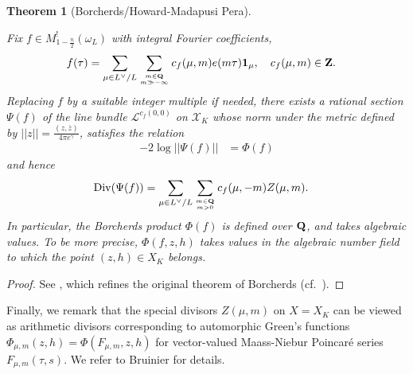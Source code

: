 \documentclass{amsart}
\newtheorem{theorem}{Theorem}[section]
\theoremstyle{definition}
\theoremstyle{definition}
\theoremstyle{definition}
\begin{document}
\begin{theorem}[Borcherds/Howard-Madapusi Pera]\label{HM-P}

Fix $f \in M_{1-\frac{n}{2}}^!(\omega_L)$ with integral Fourier coefficients,
\begin{align*} f(\tau) &= \sum\limits_{\mu \in L^{\vee}/L} 
\sum\limits_{m \in {\bf{Q}} \atop m \gg - \infty} c_f(\mu, m) e(m \tau) {\bf{1}}_{\mu}, \quad c_f(\mu, m) \in {\bf{Z}}.\end{align*}
Replacing $f$ by a suitable integer multiple if needed, there exists a rational section $\Psi(f)$ of the line bundle 
$\mathcal{L}^{c_f(0,0)}$ on $\mathcal{X}_K$ whose norm under the metric defined by $\vert \vert z \vert \vert = \frac{(z, \overline{z})}{4 \pi e^{\gamma}}$,
satisfies the relation 
\begin{align*} - 2 \log \vert \vert \Psi(f) \vert \vert &= \Phi(f) \end{align*}
and hence 
\begin{align*} \operatorname{Div}(\Psi(f)) &= \sum\limits_{\mu \in L^{\vee}/L} \sum\limits_{m \in {\bf{Q}} \atop m>0 } c_f(\mu, -m) Z(\mu, m). \end{align*}
In particular, the Borcherds product $\Phi(f)$ is defined over ${\bf{Q}}$, and takes algebraic values.
To be more precise, $\Phi(f, z, h)$ takes values in the algebraic number field to which the point $(z, h) \in X_K$ belongs. \end{theorem}

\begin{proof} See \cite[Theorem 9.1.1]{HMP}, which refines the original theorem of Borcherds \cite{Bo} (cf.~\cite[Theorem 5.2.2]{HMP}). \end{proof}

Finally, we remark that the special divisors $Z(\mu, m)$ on $X=X_K$ can be viewed as arithmetic divisors corresponding
to automorphic Green's functions $\Phi_{\mu, m}(z, h) = \Phi(F_{\mu, m}, z, h)$ for vector-valued Maass-Niebur Poincar\'e series $F_{\mu, m}(\tau, s)$.
We refer to Bruinier \cite{Br} for details. 


\end{document}
